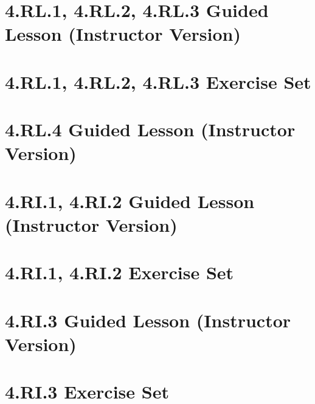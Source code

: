 \documentclass[a4paper,12pt]{article}
\title{}
\date{}
\begin{document}

\hypertarget{toc}{}
\tableofcontents
\newpage

\pagestyle{fancy}

\newpage
\section{4.RL.1, 4.RL.2, 4.RL.3 Guided Lesson (Instructor Version)}


\newpage
\section{4.RL.1, 4.RL.2, 4.RL.3 Exercise Set }


\newpage
\section{4.RL.4 Guided Lesson (Instructor Version)}


% 

\newpage
\section{4.RI.1, 4.RI.2 Guided Lesson (Instructor Version)}


\newpage
\section{4.RI.1, 4.RI.2 Exercise Set }


\newpage
\section{4.RI.3 Guided Lesson (Instructor Version)}


\newpage
\section{4.RI.3 Exercise Set }

\end{document}
